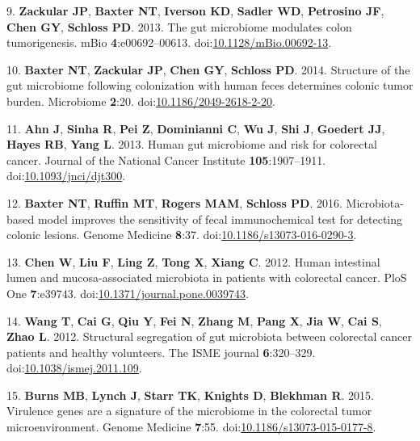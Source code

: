 \documentclass[12pt,]{article}
\begin{document}
\hypertarget{ref-zackular_gut_2013}{}
9. \textbf{Zackular JP}, \textbf{Baxter NT}, \textbf{Iverson KD},
\textbf{Sadler WD}, \textbf{Petrosino JF}, \textbf{Chen GY},
\textbf{Schloss PD}. 2013. The gut microbiome modulates colon
tumorigenesis. mBio \textbf{4}:e00692--00613.
doi:\href{https://doi.org/10.1128/mBio.00692-13}{10.1128/mBio.00692-13}.

\hypertarget{ref-baxter_structure_2014}{}
10. \textbf{Baxter NT}, \textbf{Zackular JP}, \textbf{Chen GY},
\textbf{Schloss PD}. 2014. Structure of the gut microbiome following
colonization with human feces determines colonic tumor burden.
Microbiome \textbf{2}:20.
doi:\href{https://doi.org/10.1186/2049-2618-2-20}{10.1186/2049-2618-2-20}.

\hypertarget{ref-ahn_human_2013}{}
11. \textbf{Ahn J}, \textbf{Sinha R}, \textbf{Pei Z}, \textbf{Dominianni
C}, \textbf{Wu J}, \textbf{Shi J}, \textbf{Goedert JJ}, \textbf{Hayes
RB}, \textbf{Yang L}. 2013. Human gut microbiome and risk for colorectal
cancer. Journal of the National Cancer Institute
\textbf{105}:1907--1911.
doi:\href{https://doi.org/10.1093/jnci/djt300}{10.1093/jnci/djt300}.

\hypertarget{ref-baxter_microbiota-based_2016}{}
12. \textbf{Baxter NT}, \textbf{Ruffin MT}, \textbf{Rogers MAM},
\textbf{Schloss PD}. 2016. Microbiota-based model improves the
sensitivity of fecal immunochemical test for detecting colonic lesions.
Genome Medicine \textbf{8}:37.
doi:\href{https://doi.org/10.1186/s13073-016-0290-3}{10.1186/s13073-016-0290-3}.

\hypertarget{ref-chen_human_2012}{}
13. \textbf{Chen W}, \textbf{Liu F}, \textbf{Ling Z}, \textbf{Tong X},
\textbf{Xiang C}. 2012. Human intestinal lumen and mucosa-associated
microbiota in patients with colorectal cancer. PloS One
\textbf{7}:e39743.
doi:\href{https://doi.org/10.1371/journal.pone.0039743}{10.1371/journal.pone.0039743}.

\hypertarget{ref-wang_structural_2012}{}
14. \textbf{Wang T}, \textbf{Cai G}, \textbf{Qiu Y}, \textbf{Fei N},
\textbf{Zhang M}, \textbf{Pang X}, \textbf{Jia W}, \textbf{Cai S},
\textbf{Zhao L}. 2012. Structural segregation of gut microbiota between
colorectal cancer patients and healthy volunteers. The ISME journal
\textbf{6}:320--329.
doi:\href{https://doi.org/10.1038/ismej.2011.109}{10.1038/ismej.2011.109}.

\hypertarget{ref-burns_virulence_2015}{}
15. \textbf{Burns MB}, \textbf{Lynch J}, \textbf{Starr TK},
\textbf{Knights D}, \textbf{Blekhman R}. 2015. Virulence genes are a
signature of the microbiome in the colorectal tumor microenvironment.
Genome Medicine \textbf{7}:55.
doi:\href{https://doi.org/10.1186/s13073-015-0177-8}{10.1186/s13073-015-0177-8}.
\end{document}
